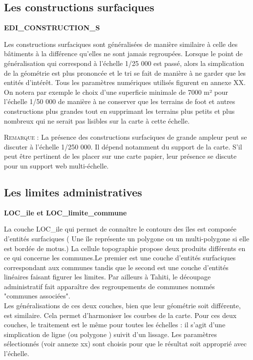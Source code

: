 \subsection{Les constructions surfaciques}
\begin{center}
    \footnotesize
    \textbf{EDI\_CONSTRUCTION\_S}
\end{center}

Les constructions surfaciques sont généralisées de manière similaire à celle des bâtiments à la différence qu'elles ne sont jamais regroupées. Lorsque le point de généralisation qui correspond à l'échelle 1/25 000 est passé, alors la simplication de la géométrie est plus prononcée et le tri se fait de manière à ne garder que les entités d'intérêt. Tous les paramètres numériques utilisés figurent en annexe XX. On notera par exemple le choix d'une superficie minimale de 7000 m² pour l'échelle 1/50 000 de manière à ne conserver que les terrains de foot et autres constructions plus grandes tout en supprimant les terrains plus petits et plus nombreux qui ne serait pas lisibles sur la carte à cette échelle.

\textsc{Remarque :}
La présence des constructions surfaciques de grande ampleur peut se discuter à l'échelle 1/250 000. Il dépend notamment du support de la carte. S'il peut être pertinent de les placer sur une carte papier, leur présence se discute pour un support web multi-échelle. 

\subsection{Les limites administratives}

\begin{center}
    \footnotesize
    \textbf{LOC\_ile et LOC\_limite\_commune}
\end{center}

La couche LOC\_ile qui permet de connaître le contours des îles est composée d'entités surfaciques ( Une île représente un polygone ou un multi-polygone si elle est bordée de motus.)
La cellule topographie propose deux produits différents en ce qui concerne les communes.Le premier est une couche d'entités surfaciques correspondant aux communes tandis que le second est une couche d'entités linéaires faisant figurer les limites. Par ailleurs à Tahiti, le découpage administratif fait apparaître des regroupements de communes nommés "communes associées".\\

Les généralisations de ces deux couches, bien que leur géométrie soit différente, est similaire. Cela permet d'harmoniser les courbes de la carte. Pour ces deux couches, le traitement est le même pour toutes les échelles : il s'agit d'une simplication de ligne (ou polygone ) suivit d'un lissage. Les paramètres sélectionnés (voir annexe xx) sont choisis pour que le résultat soit approprié avec l'échelle.

